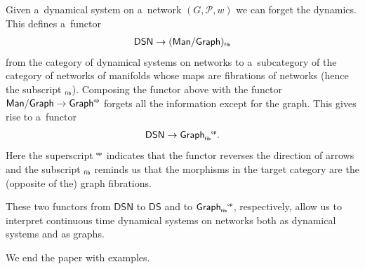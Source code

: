 \documentclass[10pt,a4paper]{amsart}
\numberwithin{equation}{section}
\newcommand{\op}[1]{{#1}^{\mbox{\sf{\tiny{op}}}}}
\newcommand{\gf}[1]{{#1}_{\mbox{\sf{\tiny{f\/ib}}}}}
\newcommand{\opfib}[1]{{{#1}_{\mbox{\sf{\tiny{f\/ib}}}}}^{\mbox{\sf{\tiny{op}}}}}
\begin{document}
\begin{Remark}
Given a~dynamical system on a~network $(G,{\mathcal P},w)$ we can forget the dynamics.
This def\/ines a~functor
\begin{gather*}
\mathsf{DSN} \to (\mathsf{Man}/\mathsf{Graph})_{\mbox{\sf{\tiny{f\/ib}}}}
\end{gather*}
from the category of dynamical systems on networks to a~subcategory of the category of networks of manifolds whose maps
are f\/ibrations of networks (hence the subscript $_{\mbox{\sf{\tiny{f\/ib}}}}$).
Composing the functor above with the functor $\mathsf{Man}/\mathsf{Graph} \to \op{\mathsf{Graph}}$ forgets all the
information except for the graph.
This gives rise to a~functor
\begin{gather*}
\mathsf{DSN}\to \opfib{\mathsf{Graph}}.
\end{gather*}
Here the superscript $\op{}$ indicates that the functor reverses the direction of arrows and the subscript $\gf{}$
reminds us that the morphisms in the target category are the (opposite of the) graph f\/ibrations.

These two functors from $\mathsf{DSN}$ to $\mathsf{DS}$ and to $\opfib{\mathsf{Graph}}$, respectively, allow us to
interpret continuous time dynamical systems on networks both as dynamical systems and as graphs.
\end{Remark}
We end the paper with examples.
\end{document}

